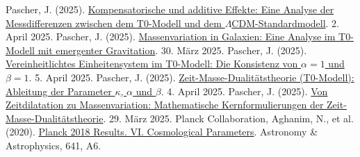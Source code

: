 \documentclass[a4paper,12pt]{article}
\begin{document}
	\begin{thebibliography}{99}
		 Pascher, J. (2025). \href{https://github.com/jpascher/T0-Time-Mass-Duality/tree/main/2/pdf/Deutsch/Analyse\%20der\%20Messdifferenzen\%20zwischen\%20dem\%20T0-Modell\%20und\%20dem\%20Standardmodell.pdf}{Kompensatorische und additive Effekte: Eine Analyse der Messdifferenzen zwischen dem T0-Modell und dem \(\Lambda\)CDM-Standardmodell}. 2. April 2025.
		 Pascher, J. (2025). \href{https://github.com/jpascher/T0-Time-Mass-Duality/tree/main/2/pdf/Deutsch/Massenvariation\%20in\%20Galaxien.pdf}{Massenvariation in Galaxien: Eine Analyse im T0-Modell mit emergenter Gravitation}. 30. März 2025.
		 Pascher, J. (2025). \href{https://github.com/jpascher/T0-Time-Mass-Duality/tree/main/2/pdf/Deutsch/Die\%20Konsistenz\%20von\%20alpha\%20=\%201\%20und\%20beta\%20=\%201.pdf}{Vereinheitlichtes Einheitensystem im T0-Modell: Die Konsistenz von \(\alpha = 1\) und \(\beta = 1\)}. 5. April 2025.
		 Pascher, J. (2025). \href{https://github.com/jpascher/T0-Time-Mass-Duality/tree/main/2/pdf/Deutsch/Zeit-Masse-Dualit\%C3\%A4tstheorie\%20(T0-Modell)\%20Herleitung\%20der\%20Parameter\%20kappa,\%20alpha\%20und\%20beta.pdf}{Zeit-Masse-Dualitätstheorie (T0-Modell): Ableitung der Parameter \(\kappa\), \(\alpha\) und \(\beta\)}. 4. April 2025.
		 Pascher, J. (2025). \href{https://github.com/jpascher/T0-Time-Mass-Duality/tree/main/2/pdf/Deutsch/Mathematische\%20Formulierungen\%20der\%20Zeit-Masse-Dualit\%C3\%A4tstheorie\%20mit\%20Lagrange.pdf}{Von Zeitdilatation zu Massenvariation: Mathematische Kernformulierungen der Zeit-Masse-Dualitätstheorie}. 29. März 2025.
		 Planck Collaboration, Aghanim, N., et al. (2020). \href{https://doi.org/10.1051/0004-6361/201833910}{Planck 2018 Results. VI. Cosmological Parameters}. Astronomy \& Astrophysics, 641, A6.
	\end{thebibliography}
	
\end{document}
